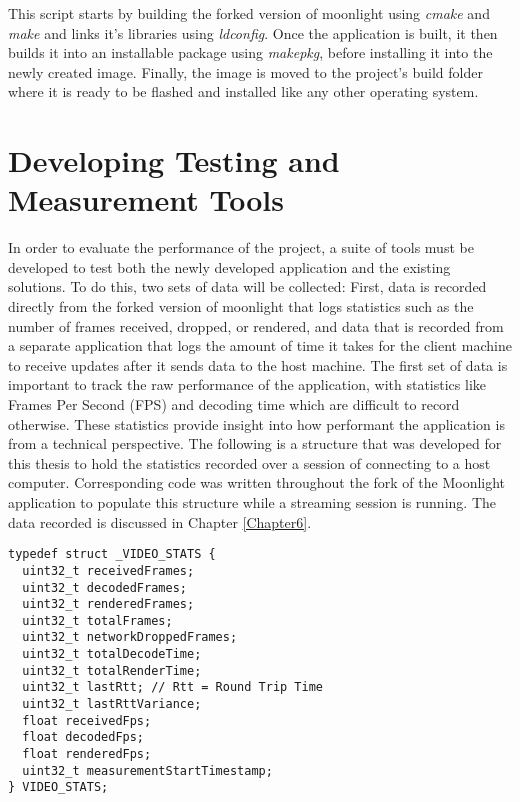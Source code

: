 This script starts by building the forked version of moonlight using \emph{cmake} and \emph{make} and links it's libraries using \emph{ldconfig}.
Once the application is built, it then builds it into an installable package using \emph{makepkg}, before installing it into the newly created image.
Finally, the image is moved to the project's build folder where it is ready to be flashed and installed like any other operating system.


\section{Developing Testing and Measurement Tools}\label{sec:DevelopingTestingAndMeasurementTools}

In order to evaluate the performance of the project, a suite of tools must be developed to test both the newly developed application and the existing solutions.
To do this, two sets of data will be collected: First, data is recorded directly from the forked version of moonlight that logs statistics such as the number of frames received, dropped, or rendered, and data that is recorded from a separate application that logs the amount of time it takes for the client machine to receive updates after it sends data to the host machine.
The first set of data is important to track the raw performance of the application, with statistics like Frames Per Second (FPS) and decoding time which are difficult to record otherwise.
These statistics provide insight into how performant the application is from a technical perspective.
The following is a structure that was developed for this thesis to hold the statistics recorded over a session of connecting to a host computer.
Corresponding code was written throughout the fork of the Moonlight application to populate this structure while a streaming session is running.
The data recorded is discussed in Chapter \ref{Chapter6}.

\begin{lstlisting}[style=customc,firstnumber=23,title=Excerpt from \emph{moonlight/src/video/stats.h}]
typedef struct _VIDEO_STATS {
  uint32_t receivedFrames;
  uint32_t decodedFrames;
  uint32_t renderedFrames;
  uint32_t totalFrames;
  uint32_t networkDroppedFrames;
  uint32_t totalDecodeTime;
  uint32_t totalRenderTime;
  uint32_t lastRtt; // Rtt = Round Trip Time
  uint32_t lastRttVariance;
  float receivedFps;
  float decodedFps;
  float renderedFps;
  uint32_t measurementStartTimestamp;
} VIDEO_STATS;
\end{lstlisting}

